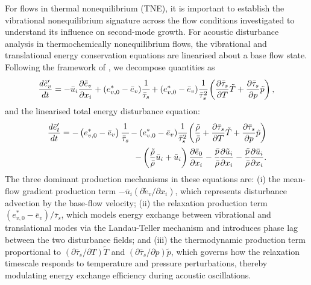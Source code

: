 For flows in thermal nonequilibrium (\gls{TNE}), it is important to establish the vibrational nonequilibrium signature across the flow conditions investigated to understand its influence on second-mode growth. For acoustic disturbance analysis in thermochemically nonequilibrium flows, the vibrational and translational energy conservation equations are linearised about a base flow state. Following the framework of \citet{Wagnild2012}, we decompose quantities as  \begin{equation}\label{equation:vibrational_disturbance}
\frac{d\tilde{e}_v'}{dt} = -\bar{u}_i \frac{\partial \tilde{e}_{v}}{\partial x_i} + (e_{v,0}^* - \bar{e}_v) \cfrac{1}{\bar{\tau}_{s}} + (e_{v,0}^* - \bar{e}_v) \cfrac{1}{\bar{\tau}_{s}^2} \left( \frac{\partial \bar{\tau}_s}{\partial T} \tilde{T} + \frac{\partial \bar{\tau}_s}{\partial p} \tilde{p} \right),
\end{equation} and the linearised total energy disturbance equation: \begin{equation}\label{equation:translational_disturbance}
\begin{split}
\frac{d\tilde{e}_t'}{dt} = -\left(e_{v,0}^* - \bar{e}_v\right) \cfrac{1}{\bar{\tau}_{s}} - (e_{v,0}^* - \bar{e}_v) \cfrac{1}{\bar{\tau}_{s}^2} \left( \frac{\tilde{\rho}}{\bar{\rho}} + \frac{\partial \bar{\tau}_s}{\partial T} \tilde{T} + \frac{\partial \bar{\tau}_s}{\partial p} \tilde{p} \right) \\
- \left( \frac{\tilde{\rho}}{\bar{\rho}} \bar{u}_{i} + \tilde{u}_i \right) \frac{\partial \bar{e}_0}{\partial x_i} - \cfrac{\bar{p}}{\bar{\rho}} \frac{\partial \tilde{u}_i}{\partial x_i} - \cfrac{\tilde{p}}{\bar{\rho}} \frac{\partial \bar{u}_{i}}{\partial x_i}.
\end{split}
\end{equation}
The three dominant production mechanisms in these equations are: (i) the mean-flow gradient production term $-\bar{u}_i (\partial \tilde{e}_{v}/\partial x_i)$, which represents disturbance advection by the base-flow velocity; (ii) the relaxation production term $(e_{v,0}^* - \bar{e}_v)/\bar{\tau}_s$, which models energy exchange between vibrational and translational modes via the Landau-Teller mechanism and introduces phase lag between the two disturbance fields; and (iii) the thermodynamic production term proportional to $(\partial \bar{\tau}_s/\partial T) \tilde{T}$ and $(\partial \bar{\tau}_s/\partial p) \tilde{p}$, which governs how the relaxation timescale responds to temperature and pressure perturbations, thereby modulating energy exchange efficiency during acoustic oscillations.

